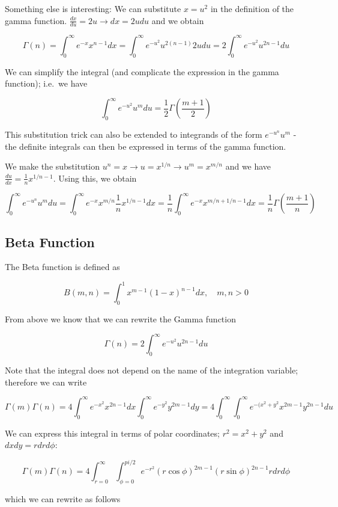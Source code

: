 Something else is interesting: We can substitute \(x=u^2\) in the
definition of the gamma function.
\(\frac{dx}{du}=2u \rightarrow dx=2u du\) and we obtain

\[
\Gamma(n) = \int_0^\infty e^{-x} x^{n-1} dx = \int_0^\infty e^{-u^2} u^{2(n-1)} 2u du = 2 \int_0^\infty e^{-u^2} u^{2n-1} du
\]

We can simplify the integral (and complicate the expression in the gamma
function); i.e.~we have

\[
\int_0^\infty e^{-u^2} u^m du = \frac{1}{2} \Gamma \left( \frac{m+1}{2} \right)
\]

This substitution trick can also be extended to integrands of the form
\(e^{-u^n} u^m\) - the definite integrals can then be expressed in terms
of the gamma function.

We make the substitution
\(u^n = x \rightarrow u=x^{1/n} \rightarrow u^m = x^{m/n}\) and we have
\(\frac{du}{dx} = \frac{1}{n}x^{1/n - 1}\). Using this, we obtain

\[
\int_0^\infty e^{-u^n} u^m du = \int_0^\infty e^{-x} x^{m/n} \frac{1}{n} x^{1/n-1} dx = \frac{1}{n} \int_0^\infty  e^{-x} x^{m/n + 1/n - 1} dx = \frac{1}{n} \Gamma \left( \frac{m+1}{n} \right)
\]

\subsection{Beta Function}

The Beta function is defined as

\[
B(m,n) = \int_0^1 x^{m-1} (1-x)^{n-1} dx, \quad m,n > 0
\]

From above we know that we can rewrite the Gamma function

\[
\Gamma(n) = 2 \int_0^\infty e^{-u^2} u^{2n-1} du
\]

Note that the integral does not depend on the name of the integration
variable; therefore we can write

\[
\Gamma(m) \Gamma(n) = 4 \int_0^\infty e^{-x^2} x^{2n-1} dx \int_0^\infty e^{-y^2} y^{2m-1} dy = 4 \int_0^\infty \int_0^\infty e^{-(x^2+y^2} x^{2m-1} y^{2n-1} du
\]

We can express this integral in terms of polar coordinates;
\(r^2 = x^2 + y^2\) and \(dx dy = r dr d\phi\):

\[
\Gamma(m) \Gamma(n) = 4 \int_{r=0}^\infty \int_{\phi=0}^{pi/2}  e^{-r^2} (r \cos \phi)^{2m-1} (r \sin \phi)^{2n-1} r dr d\phi
\]

which we can rewrite as follows

